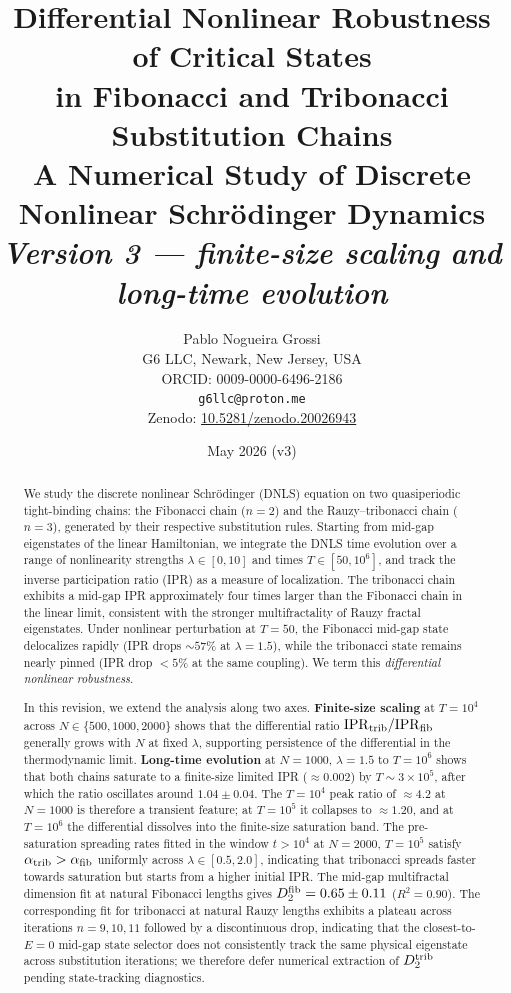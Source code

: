 \documentclass[12pt,a4paper]{article}
\title{\textbf{Differential Nonlinear Robustness of Critical States\\
in Fibonacci and Tribonacci Substitution Chains}\\[0.5em]
\large A Numerical Study of Discrete Nonlinear Schr\"{o}dinger Dynamics\\
\large \emph{Version 3 --- finite-size scaling and long-time evolution}}
\author{Pablo Nogueira Grossi\\
G6 LLC, Newark, New Jersey, USA\\
ORCID: 0009-0000-6496-2186\\
\texttt{g6llc@proton.me}\\[0.3em]
\small Zenodo: \href{https://doi.org/10.5281/zenodo.20026943}{10.5281/zenodo.20026943}}
\date{May 2026 (v3)}
\begin{document}
\maketitle

\begin{abstract}
We study the discrete nonlinear Schr\"{o}dinger (DNLS) equation on two
quasiperiodic tight-binding chains: the Fibonacci chain ($n=2$) and the
Rauzy--tribonacci chain ($n=3$), generated by their respective substitution
rules. Starting from mid-gap eigenstates of the linear Hamiltonian, we
integrate the DNLS time evolution over a range of nonlinearity strengths
$\lambda \in [0,10]$ and times $T \in [50, 10^6]$, and track the inverse
participation ratio (IPR) as a measure of localization. The tribonacci chain
exhibits a mid-gap IPR approximately four times larger than the Fibonacci
chain in the linear limit, consistent with the stronger multifractality of
Rauzy fractal eigenstates. Under nonlinear perturbation at $T=50$, the
Fibonacci mid-gap state delocalizes rapidly (IPR drops $\sim 57\%$ at
$\lambda=1.5$), while the tribonacci state remains nearly pinned (IPR drop
$<5\%$ at the same coupling). We term this \emph{differential nonlinear
robustness}.

In this revision, we extend the analysis along two axes. \textbf{Finite-size
scaling} at $T=10^4$ across $N \in \{500, 1000, 2000\}$ shows that the
differential ratio $\mathrm{IPR}_{\rm trib}/\mathrm{IPR}_{\rm fib}$
generally grows with $N$ at fixed $\lambda$, supporting persistence of the
differential in the thermodynamic limit. \textbf{Long-time evolution} at
$N=1000$, $\lambda=1.5$ to $T=10^6$ shows that both chains saturate to a
finite-size limited IPR ($\approx 0.002$) by $T \sim 3\times10^5$, after
which the ratio oscillates around $1.04 \pm 0.04$. The $T=10^4$ peak ratio of
$\approx 4.2$ at $N=1000$ is therefore a transient feature; at $T=10^5$ it
collapses to $\approx 1.20$, and at $T=10^6$ the differential dissolves into
the finite-size saturation band. The pre-saturation spreading rates fitted
in the window $t > 10^4$ at $N=2000$, $T=10^5$ satisfy $\alpha_{\rm trib} >
\alpha_{\rm fib}$ uniformly across $\lambda \in [0.5, 2.0]$, indicating that
tribonacci spreads faster towards saturation but starts from a higher initial
IPR. The mid-gap multifractal dimension fit at natural Fibonacci lengths
gives $D_2^{\rm fib} = 0.65 \pm 0.11$ ($R^2 = 0.90$). The corresponding fit
for tribonacci at natural Rauzy lengths exhibits a plateau across iterations
$n=9,10,11$ followed by a discontinuous drop, indicating that the closest-to-
$E=0$ mid-gap state selector does not consistently track the same physical
eigenstate across substitution iterations; we therefore defer numerical
extraction of $D_2^{\rm trib}$ pending state-tracking diagnostics.


\end{abstract}
\end{document}
